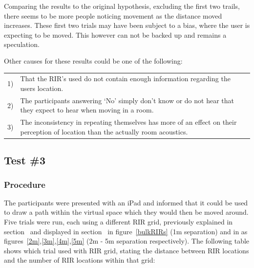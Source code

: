 \documentclass[../../main.tex]{subfiles}
\begin{document}
				Comparing the results to the original hypothesis, excluding the first two trails, there seems to be more people noticing movement as the distance moved increases. These first two trials may have been subject to a bias, where the user is expecting to be moved. This however can not be backed up and remains a speculation.

				Other causes for these results could be one of the following:

				\begin{tabular}{l p{}}
				1) & That the \ac{RIR}'s used do not contain enough information regarding the users location. \\
				2) & The participants answering `No' simply don't know or do not hear that they expect to hear when moving in a room.\\
				3) & The inconsistency in repeating themselves has more of an effect on their perception of location than the actually room acoustics.
				\end{tabular}


		\subsection{Test \#3}

			\subsubsection{Procedure}
				The participants were presented with an iPad and informed that it could be used to draw a path within the virtual space which they would then be moved around. Five trials were run, each using a different \ac{RIR} grid, previously explained in section~ and displayed in section~  in figure~\ref{bulkRIRs} (1m separation) and in  as figures~\ref{2m},\ref{3m},\ref{4m},\ref{5m} (2m - 5m separation respectively). The following table shows which trial used with \ac{RIR} grid, stating the distance between \ac{RIR} locations and the number of \ac{RIR} locations within that grid:
\end{document}
